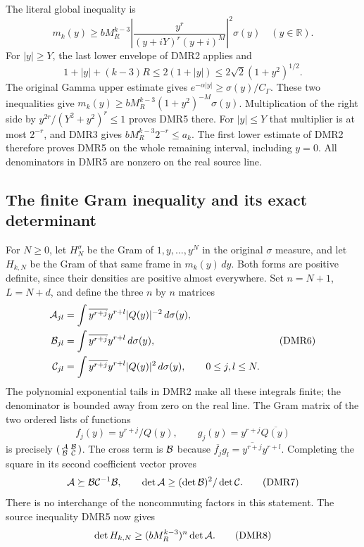 The literal global inequality is
\[
 \boxed{\quad
 m_k(y)\geq bM_R^{k-3}
     \left|\frac{y^r}{(y+iY)^r(y+i)^M}\right|^2\sigma(y)
       \quad(y\in\mathbb R).\quad}
 \tag{DMR5}
\]
For $|y|\geq Y$, the last lower envelope of DMR2 applies and
\[
 1+|y|+(k-3)R\leq2(1+|y|)
                           \leq2\sqrt2(1+y^2)^{1/2}.
\]
The original Gamma upper estimate gives
$e^{-\alpha|y|}\geq \sigma(y)/C_\Gamma$.
These two inequalities give
$m_k(y)\geq bM_R^{k-3}(1+y^2)^{-M}\sigma(y)$.
Multiplication of the right side by
$y^{2r}/(Y^2+y^2)^r\leq1$ proves DMR5 there.
For $|y|\leq Y$ that multiplier is at most $2^{-r}$, and DMR3
gives $bM_R^{k-3}2^{-r}\leq a_k$. The first lower estimate of DMR2
therefore proves DMR5 on the whole remaining interval, including
$y=0$. All denominators in DMR5 are nonzero on the real source line.

\subsection{The finite Gram inequality and its exact determinant}

For $N\geq0$, let $H_N^\sigma$ be the Gram of $1,y,\ldots,y^N$
in the original $\sigma$ measure, and let $H_{k,N}$ be the Gram
of that same frame in $m_k(y)\,dy$. Both forms are positive
definite, since their densities are positive almost everywhere.
Set $n=N+1$, $L=N+d$, and define the three $n$ by $n$ matrices
\[
 \begin{split}
 {\cal A}_{jl}&=\int \overline{y^{r+j}}y^{r+l}|Q(y)|^{-2}\,d\sigma(y),\\
 {\cal B}_{jl}&=\int \overline{y^{r+j}}y^{r+l}\,d\sigma(y),\\
 {\cal C}_{jl}&=\int \overline{y^{r+j}}y^{r+l}|Q(y)|^2\,d\sigma(y),
                  \qquad 0\leq j,l\leq N.
 \end{split}\tag{DMR6}
\]
The polynomial exponential tails in DMR2 make all these integrals
finite; the denominator is bounded away from zero on the real line.
The Gram matrix of the two ordered lists of functions
\[
 f_j(y)=y^{r+j}/Q(y),\qquad
 g_j(y)=y^{r+j}\overline{Q(y)}
\]
is precisely
$\left(\begin{smallmatrix}{\cal A}&{\cal B}\\
{\cal B}&{\cal C}\end{smallmatrix}\right)$.
The cross term is $ {\cal B}$ because
$\overline{f_j}g_l=\overline{y^{r+j}}y^{r+l}$.
Completing the square in its second coefficient vector proves
\[
 {\cal A}\succeq{\cal B}{\cal C}^{-1}{\cal B},\qquad
 \det{\cal A}\geq(\det{\cal B})^2/\det{\cal C}.
 \tag{DMR7}
\]
There is no interchange of the noncommuting factors in this statement.
The source inequality DMR5 now gives
\[
 \det H_{k,N}\geq (bM_R^{k-3})^n\det{\cal A}.
 \tag{DMR8}
\]

